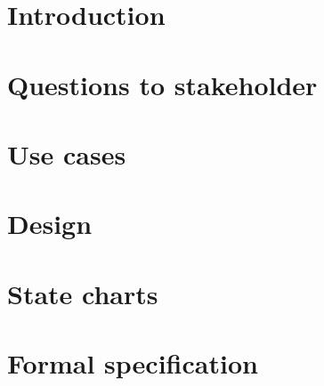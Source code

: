 \documentclass[a4paper,11pt]{article}
\begin{document}
	
	
	\tableofcontents
	\newpage
	
	\section{Introduction}
	
	\newpage

	\section{Questions to stakeholder}
	
	\newpage
	
	\section{Use cases}
	
	\newpage

	\section{Design}
	
	\newpage

	\section{State charts}
	
	\newpage

	\section{Formal specification}
	
	\newpage
\end{document}
